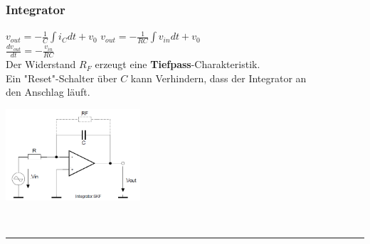		\begin{minipage}[c]{12cm}
		\subsubsection{Integrator} 
			$v_{out}=-\frac{1}{C} \int{i_C}dt + v_0$
			$v_{out}=-\frac{1}{RC} \int{v_{in}}dt +
			v_0 $\\
			$\frac{dv_{out}}{dt}=-\frac{v_{in}}{RC}$\\
			Der Widerstand $R_F$ erzeugt eine {\bf Tiefpass}-Charakteristik. \\
			Ein "Reset"-Schalter über $C$ kann Verhindern, dass der Integrator an\\
			den Anschlag läuft.
		\end{minipage} 
		\begin{minipage}[c]{5cm}
          	\includegraphics[width=5cm]{./images/integrator.png} 
        \end{minipage}\\
\hrule     	
		

